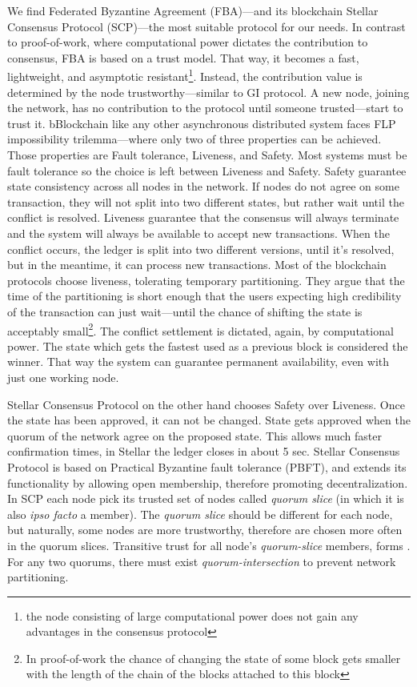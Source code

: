 We find Federated Byzantine Agreement (FBA)––and its blockchain Stellar Consensus Protocol (SCP)\cite{mazieres2015stellar}––the most suitable protocol for our needs. In contrast to proof-of-work, where computational power dictates the contribution to consensus, FBA is based on a trust model. That way, it becomes a fast, lightweight, and asymptotic resistant\footnote{the node consisting of large computational power does not gain any advantages in the consensus protocol}. Instead, the contribution value is determined by the node trustworthy––similar to GI protocol. A new node, joining the network, has no contribution to the protocol until someone trusted––start to trust it.
bBlockchain like any other asynchronous distributed system faces FLP\cite{fischer1985impossibility} impossibility trilemma––where only two of three properties can be achieved. Those properties are Fault tolerance, Liveness, and Safety. Most systems must be fault tolerance so the choice is left between Liveness and Safety. Safety guarantee state consistency across all nodes in the network. If nodes do not agree on some transaction, they will not split into two different states, but rather wait until the conflict is resolved. Liveness guarantee that the consensus will always terminate and the system will always be available to accept new transactions. When the conflict occurs, the ledger is split into two different versions, until it's resolved, but in the meantime, it can process new transactions. Most of the blockchain protocols choose liveness, tolerating temporary partitioning. They argue that the time of the partitioning is short enough that the users expecting high credibility of the transaction can just wait---until the chance of shifting the state is acceptably small\footnote{In proof-of-work the chance of changing the state of some block gets smaller with the length of the chain of the blocks attached to this block}. The conflict settlement is dictated, again, by computational power. The state which gets the fastest used as a previous block is considered the winner. That way the system can guarantee permanent availability, even with just one working node. 

Stellar Consensus Protocol on the other hand chooses Safety over Liveness. Once the state has been approved, it can not be changed. State gets approved when the quorum of the network agree on the proposed state. This allows much faster confirmation times, in Stellar the ledger closes in about 5 sec. 
Stellar Consensus Protocol is based on Practical Byzantine fault tolerance (PBFT)\cite{castro1999practical}, and extends its functionality by allowing open membership, therefore promoting decentralization. In SCP each node pick its trusted set of nodes called \textit{quorum slice} (in which it is also \textit{ipso facto} a member). The \textit{quorum slice} should be different for each node, but naturally, some nodes are more trustworthy, therefore are chosen more often in the quorum slices. Transitive trust for all node's \textit{quorum-slice} members, forms . For any two quorums, there must exist \textit{quorum-intersection} to prevent network partitioning.

